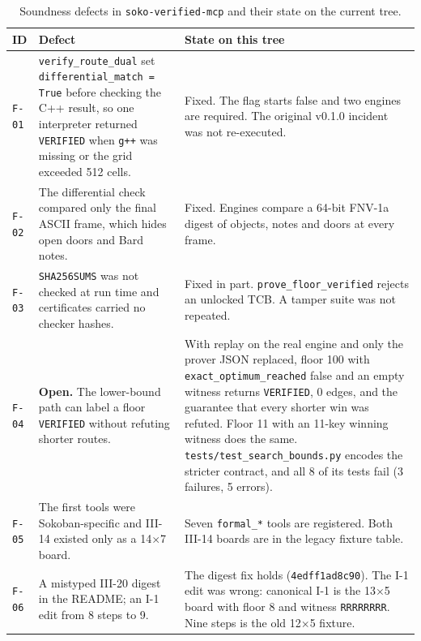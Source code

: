 \documentclass[11pt,a4paper]{article}
\begin{document}
\begin{table}[!htbp]
\centering
\caption{Soundness defects in \texttt{soko-verified-mcp} and their state on the current tree.}
\label{tab:audit}
\small
\begin{tabularx}{\linewidth}{@{}l>{\raggedright\arraybackslash}X>{\raggedright\arraybackslash}X@{}}
\toprule
\textbf{ID} & \textbf{Defect} & \textbf{State on this tree} \\
\midrule
\texttt{F-01} & \texttt{verify\_route\_dual} set \texttt{differential\_match = True} before checking the C++ result, so one interpreter returned \texttt{VERIFIED} when \texttt{g++} was missing or the grid exceeded 512 cells. & Fixed. The flag starts false and two engines are required. The original v0.1.0 incident was not re-executed. \\
\addlinespace[2pt]
\texttt{F-02} & The differential check compared only the final ASCII frame, which hides open doors and Bard notes. & Fixed. Engines compare a 64-bit FNV-1a digest of objects, notes and doors at every frame. \\
\addlinespace[2pt]
\texttt{F-03} & \texttt{SHA256SUMS} was not checked at run time and certificates carried no checker hashes. & Fixed in part. \texttt{prove\_floor\_verified} rejects an unlocked TCB. A tamper suite was not repeated. \\
\addlinespace[2pt]
\texttt{F-04} & {\color{warncolor}\textbf{Open.}} The lower-bound path can label a floor \texttt{VERIFIED} without refuting shorter routes. & With replay on the real engine and only the prover JSON replaced, floor 100 with \texttt{exact\_optimum\_reached} false and an empty witness returns \texttt{VERIFIED}, 0 edges, and the guarantee that every shorter win was refuted. Floor 11 with an 11-key winning witness does the same. \texttt{tests/test\_search\_bounds.py} encodes the stricter contract, and all 8 of its tests fail (3 failures, 5 errors). \\
\addlinespace[2pt]
\texttt{F-05} & The first tools were Sokoban-specific and III-14 existed only as a 14$\times$7 board. & Seven \texttt{formal\_*} tools are registered. Both III-14 boards are in the legacy fixture table. \\
\addlinespace[2pt]
\texttt{F-06} & A mistyped III-20 digest in the README; an I-1 edit from 8 steps to 9. & The digest fix holds (\texttt{4edff1ad8c90}). The I-1 edit was wrong: canonical I-1 is the 13$\times$5 board with floor 8 and witness \texttt{RRRRRRRR}. Nine steps is the old 12$\times$5 fixture. \\
\bottomrule
\end{tabularx}
\end{table}
\end{document}

